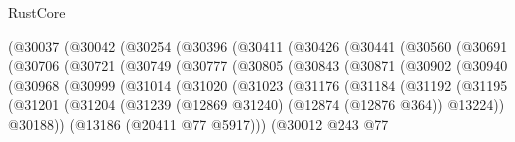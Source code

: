 \begin{lexlean}{RustCore}
\begin{coremodule}
                      (@30037
                        (@30042
                          (@30254
                            (@30396
                              (@30411
                                (@30426
                                  (@30441
                                    (@30560
                                      (@30691
                                        (@30706
                                          (@30721
                                            (@30749
                                              (@30777
                                                (@30805
                                                  (@30843
                                                    (@30871
                                                      (@30902
                                                        (@30940
                                                          (@30968
                                                            (@30999
                                                              (@31014
                                                                (@31020
                                                                  (@31023
                                                                    (@31176
                                                                      (@31184
                                                                        (@31192
                                                                          (@31195
                                                                            (@31201
                                                                              (@31204
                                                                                (@31239
                                                                                  (@12869 @31240)
                                                                                  (@12874
                                                                                    (@12876 @364))
                                                                                  @13224))
                                                                              @30188))
                                                                          (@13186
                                                                            (@20411 @77 @5917)))
                                                                        (@30012
                                                                          @243
                                                                          @77

\end{coremodule}
\end{lexlean}
